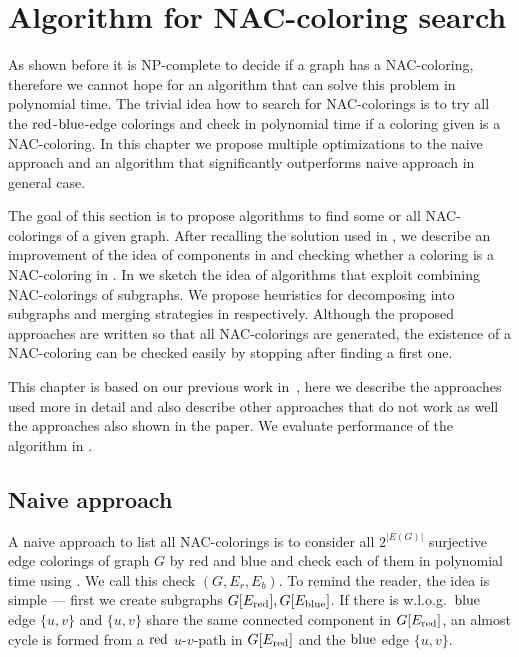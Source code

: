 \chapter{Algorithm for NAC-coloring search}%
\label{chapter:alg}

\begin{chapterabstract}

	As shown before it is NP-complete to decide if a graph has a NAC-coloring,
	therefore we cannot hope for an algorithm that can solve this problem in polynomial time.
	The trivial idea how to search for NAC-colorings is to
	try all the \( \text{red} \)-\( \text{blue} \)-edge colorings
	and check in polynomial time if a coloring given is a NAC-coloring.
	In this chapter we propose multiple optimizations to the naive approach
	and an algorithm that significantly outperforms naive approach in general case.

\end{chapterabstract}

The goal of this section is to propose algorithms to find some or all NAC-colorings of a given graph.
After recalling the solution used in \flexrilog{},
we describe an improvement of the idea of \trcon{} components in 
and checking whether a coloring is a NAC-coloring in .
In  we sketch the idea of algorithms that
exploit combining NAC-colorings of subgraphs.
We propose heuristics for decomposing into subgraphs and merging strategies
in  respectively.
Although the proposed approaches are written so that all NAC-colorings are generated,
the existence of a NAC-coloring can be checked easily by stopping after finding a first one.

This chapter is based on our previous work in~\cite{my_paper},
here we describe the approaches used more in detail
and also describe other approaches that do not work as well the approaches also
shown in the paper. We evaluate performance of the algorithm in .

\section{Naive approach}

A naive approach to list all NAC-colorings is to consider
all $2^{|E(G)|}$ surjective edge colorings of graph $G$ by red and blue
and check each of them in polynomial time using .
We call this check \IsNACColoring{}$(G, E_r, E_b)$.
To remind the reader, the idea is simple
--- first we create subgraphs \( G[E_{\text{red}}], G[E_{\text{blue}}] \).
If there is w.l.o.g.\ \( \text{blue} \) edge \( \{u, v\} \)
and \( \{u, v\} \) share the same connected component in \( G[E_{\text{red}}] \),
an almost cycle is formed from a \( \text{red} \) \( u \)-\( v \)-path in \( G[E_{\text{red}}] \)
and the \( \text{blue} \) edge \( \{u, v\} \).

